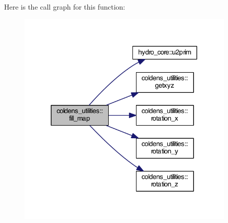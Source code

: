 Here is the call graph for this function\+:\nopagebreak
\begin{figure}[H]
\begin{center}
\leavevmode
\includegraphics[width=296pt]{namespacecoldens__utilities_af035b829538114f8b62f54365269bdab_cgraph}
\end{center}
\end{figure}


\hypertarget{namespacecoldens__utilities_a7df7ce1cf8187ca5393dc35effa22020}{}
